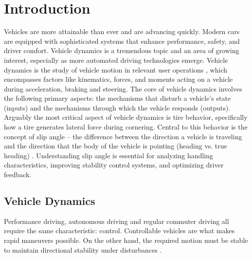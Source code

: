 \documentclass[12pt]{article}
\begin{document}
    \tableofcontents
    
    \newpage

    \section{Introduction}
        
    Vehicles are more attainable than ever and are advancing quickly. Modern cars 
    are equipped with sophisticated systems that enhance performance, safety, and driver 
    comfort. Vehicle dynamics is a tremendous topic and an area of growing interest, especially 
    as more automated driving technologies emerge. Vehicle dynamics is the study of vehicle 
    motion in relevant user operations \autocite{Jacobson_2016}, which encompasses factors like kinematics, forces, 
    and moments acting on a vehicle during acceleration, braking and steering. The core of vehicle 
    dynamics involves the following primary aspects: the mechanisms that disturb a vehicle’s state 
    (inputs) and the mechanisms through which the vehicle responds (outputs). Arguably the most 
    critical aspect of vehicle dynamics is tire behavior, specifically how a tire generates lateral 
    force during cornering. Central to this behavior is the concept of slip angle – the difference 
    between the direction a vehicle is traveling and the direction that the body of the vehicle is 
    pointing (heading vs. true heading) \autocite{Racelogic_2015}. Understanding slip angle is essential for analyzing 
    handling characteristics, improving stability control systems, and optimizing driver feedback.
        
        \subsection{Vehicle Dynamics}

        Performance driving, autonomous driving and regular commuter driving all require the same characteristic: 
        control. Controllable vehicles are what makes rapid maneuvers possible. On the other hand, the required 
        motion must be stable to maintain directional stability under disturbances \autocite{MMM}. 
\end{document}
